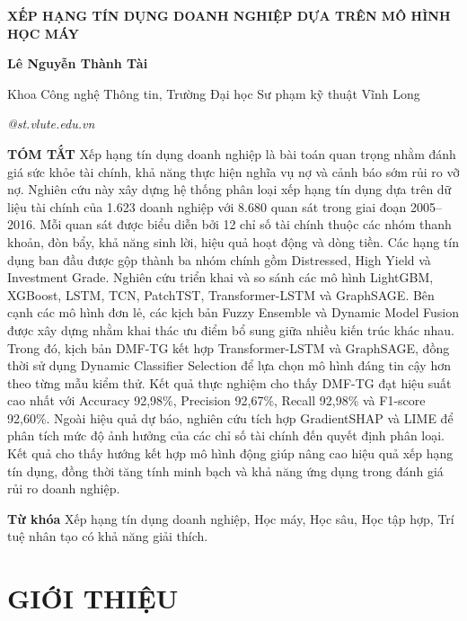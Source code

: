 \documentclass[10pt,twoside]{article}
\makeatletter
\newcommand{\arialfont}{\fontfamily{phv}\selectfont}
\newcommand{\fairsmallfont}{\fontsize{9pt}{11pt}\selectfont}
\newcommand{\fairsuperscript}[1]{%
  \raisebox{0.8ex}{\fontsize{8pt}{8pt}\selectfont #1}%
}
\newcommand{\PaperTitle}{XẾP HẠNG TÍN DỤNG DOANH NGHIỆP DỰA TRÊN MÔ HÌNH HỌC MÁY}
\newcommand{\PaperAuthors}{Lê Nguyễn Thành Tài\fairsuperscript{1}}
\newcommand{\PaperAffiliations}{%
\fairsuperscript{1}Khoa Công nghệ Thông tin, Trường Đại học Sư phạm kỹ thuật Vĩnh Long
}
\newcommand{\PaperEmail}{22022001@st.vlute.edu.vn}
\newcommand{\makefairtitle}{%
\thispagestyle{firstpage}%
\begin{center}
{\arialfont\bfseries\fontsize{14pt}{16pt}\selectfont\MakeUppercase{\PaperTitle}\par}
\vspace{3pt}
{\bfseries\fontsize{12pt}{14pt}\selectfont\PaperAuthors\par}
\vspace{3pt}
{\fairsmallfont\PaperAffiliations\par}
\vspace{3pt}
{\itshape\fairsmallfont\PaperEmail\par}
\end{center}
\vspace{6pt}%
}
\newcommand{\FairDash}{\unskip\textemdash\space}
\newenvironment{fairabstract}{%
\begingroup
\fairsmallfont
\itshape
\setlength{\parindent}{1cm}%
\setlength{\parskip}{6pt}%
}{%
\par\endgroup
}
\newcommand{\fairabstracttext}[1]{%
\begin{fairabstract}
\textbf{TÓM TẮT}\FairDash #1
\end{fairabstract}
}
\newcommand{\fairkeywords}[1]{%
\begin{fairabstract}
\textbf{Từ khóa}\FairDash #1
\end{fairabstract}
}
\makeatother
\begin{document}
\makefairtitle

\fairabstracttext{%
Xếp hạng tín dụng doanh nghiệp là bài toán quan trọng nhằm đánh giá sức khỏe tài chính, khả năng thực hiện nghĩa vụ nợ và cảnh báo sớm rủi ro vỡ nợ.
Nghiên cứu này xây dựng hệ thống phân loại xếp hạng tín dụng dựa trên dữ liệu tài chính của 1.623 doanh nghiệp với 8.680 quan sát trong giai đoạn 2005--2016. Mỗi quan sát được biểu diễn bởi 12 chỉ số tài chính thuộc các nhóm thanh khoản, đòn bẩy, khả năng sinh lời, hiệu quả hoạt động và dòng tiền. Các hạng tín dụng ban đầu được gộp thành ba nhóm chính gồm Distressed, High Yield và Investment Grade. Nghiên cứu triển khai và so sánh các mô hình LightGBM, XGBoost, LSTM, TCN, PatchTST, Transformer-LSTM và GraphSAGE. Bên cạnh các mô hình đơn lẻ, các kịch bản Fuzzy Ensemble và Dynamic Model Fusion được xây dựng nhằm khai thác ưu điểm bổ sung giữa nhiều kiến trúc khác nhau. Trong đó, kịch bản DMF-TG kết hợp Transformer-LSTM và GraphSAGE, đồng thời sử dụng Dynamic Classifier Selection để lựa chọn mô hình đáng tin cậy hơn theo từng mẫu kiểm thử. Kết quả thực nghiệm cho thấy DMF-TG đạt hiệu suất cao nhất với Accuracy 92,98\%, Precision 92,67\%, Recall 92,98\% và F1-score 92,60\%. Ngoài hiệu quả dự báo, nghiên cứu tích hợp GradientSHAP và LIME để phân tích mức độ ảnh hưởng của các chỉ số tài chính đến quyết định phân loại. Kết quả cho thấy hướng kết hợp mô hình động giúp nâng cao hiệu quả xếp hạng tín dụng, đồng thời tăng tính minh bạch và khả năng ứng dụng trong đánh giá rủi ro doanh nghiệp.
}

\fairkeywords{%
Xếp hạng tín dụng doanh nghiệp, Học máy, Học sâu, Học tập hợp, Trí tuệ nhân tạo có khả năng giải thích.
}

\section{GIỚI THIỆU}
\end{document}
